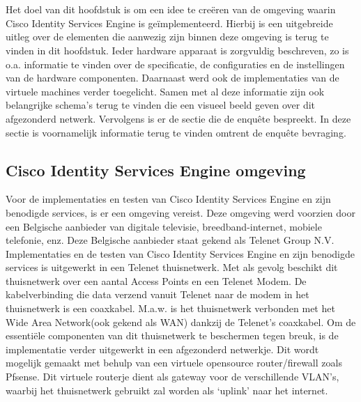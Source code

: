 
\chapter{}
\label{ch:Proof of concept}

Het doel van dit hoofdstuk is om een idee te creëren van de omgeving waarin Cisco Identity Services Engine is geïmplementeerd. Hierbij is een uitgebreide uitleg over de elementen die aanwezig zijn binnen deze omgeving is terug te vinden in dit hoofdstuk. Ieder hardware apparaat is zorgvuldig beschreven, zo is o.a. informatie te vinden over de specificatie, de configuraties en de instellingen van de hardware componenten. Daarnaast werd ook de implementaties van de virtuele machines verder toegelicht.
\newline
\newline
Samen met al deze informatie zijn ook belangrijke schema’s terug te vinden die een visueel beeld geven over dit afgezonderd netwerk. 
Vervolgens is er de sectie die de enquête bespreekt. In deze sectie is voornamelijk informatie terug te vinden omtrent de enquête bevraging. 

\section{Cisco Identity Services Engine omgeving}

Voor de implementaties en testen van Cisco Identity Services Engine en zijn benodigde services, is er een omgeving vereist. Deze omgeving werd voorzien door een Belgische aanbieder van digitale televisie, breedband-internet, mobiele telefonie, enz. Deze Belgische aanbieder staat gekend als Telenet Group N.V. Implementaties en de testen van Cisco Identity Services Engine en zijn benodigde services is uitgewerkt in een Telenet thuisnetwerk.
\newline
Met als gevolg beschikt dit thuisnetwerk over een aantal Access Points en een Telenet Modem. De kabelverbinding die data verzend vanuit Telenet naar de modem in het thuisnetwerk is een coaxkabel. M.a.w. is het thuisnetwerk verbonden met het Wide Area Network(ook gekend als WAN) dankzij de Telenet's coaxkabel.
\newline
\newline
Om de essentiële componenten van dit thuisnetwerk te beschermen tegen breuk, is de implementatie verder uitgewerkt in een afgezonderd netwerkje. Dit wordt mogelijk gemaakt met behulp van een virtuele opensource router/firewall zoals Pfsense. Dit virtuele routerje dient als gateway voor de verschillende VLAN’s, waarbij het thuisnetwerk gebruikt zal worden als ‘uplink’ naar het internet. 

